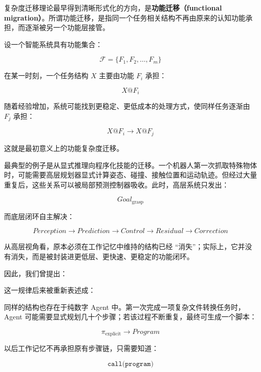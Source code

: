 复杂度迁移理论最早得到清晰形式化的方向，是\textbf{功能迁移（functional migration）}。所谓功能迁移，是指同一个任务相关结构不再由原来的认知功能承担，而逐渐被另一个功能层接管。

设一个智能系统具有功能集合：

\[
\mathcal{F}
=
\{F_1,F_2,\ldots,F_m\}
\]

在某一时刻，一个任务结构 $X$ 主要由功能 $F_i$ 承担：

\[
X@F_i
\]

随着经验增加，系统可能找到更稳定、更低成本的处理方式，使同样任务逐渐由 $F_j$ 承担：

\[
\boxed{
X@F_i
\rightarrow
X@F_j
}
\]

这就是最初意义上的功能复杂度迁移。

最典型的例子是从显式推理向程序化技能的迁移。一个机器人第一次抓取特殊物体时，可能需要高层规划器显式计算姿态、碰撞、接触位置和运动轨迹。但经过大量重复后，这些关系可以被局部预测控制器吸收。此时，高层系统只发出：

\[
Goal_{\mathrm{grasp}}
\]

而底层闭环自主解决：

\[
Perception
\rightarrow
Prediction
\rightarrow
Control
\rightarrow
Residual
\rightarrow
Correction
\]

从高层视角看，原本必须在工作记忆中维持的结构已经 ``消失''；实际上，它并没有消失，而是被封装进更低层、更快速、更稳定的功能闭环。

因此，我们曾提出：

\begin{statementbox}
\centering
{}
\end{statementbox}

这一规律后来被重新表述成：

\begin{statementbox}
\centering
{}
\end{statementbox}

同样的结构也存在于纯数字 Agent 中。第一次完成一项复杂文件转换任务时，Agent 可能需要显式规划几十个步骤；若该过程不断重复，最终可生成一个脚本：

\[
\pi_{\mathrm{explicit}}
\rightarrow
Program
\]

以后工作记忆不再承担原有步骤链，只需要知道：

\[
\texttt{call(program)}
\]

